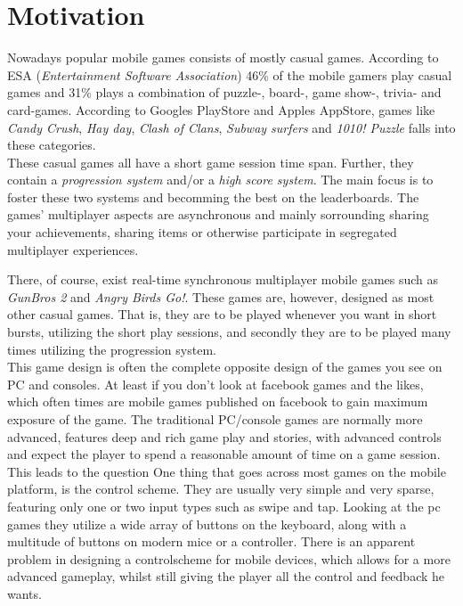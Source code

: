 \section{Motivation} \label{sec:motivation}
Nowadays popular mobile games consists of mostly casual games. According to ESA\cite{ESA}\cite{ESApdf} (\textit{Entertainment Software Association}) 46\% of the mobile gamers play casual games and 31\% plays a combination of puzzle-, board-, game show-, trivia- and card-games. According to Googles PlayStore\cite{googleplay} and Apples AppStore\cite{appstore}, games like \textit{Candy Crush}, \textit{Hay day}, \textit{Clash of Clans}, \textit{Subway surfers} and \textit{1010! Puzzle} falls into these categories.\\
These casual games all have a short game session time span. Further, they contain a \textit{progression system} and/or a \textit{high score system}. The main focus is to foster these two systems and becomming the best on the leaderboards. The games' multiplayer aspects are asynchronous and mainly sorrounding sharing your achievements, sharing items or otherwise participate in segregated multiplayer experiences.

There, of course, exist real-time synchronous multiplayer mobile games such as \textit{GunBros 2} and \textit{Angry Birds Go!}. These games are, however, designed as most other casual games. That is, they are to be played whenever you want in short bursts, utilizing the short play sessions, and secondly they are to be played many times utilizing the progression system.\\

This game design is often the complete opposite design of the games you see on PC and consoles. At least if you don't look at facebook games and the likes, which often times are mobile games published on facebook to gain maximum exposure of the game. The traditional PC/console games are normally more advanced, features deep and rich game play and stories, with advanced controls and expect the player to spend a reasonable amount of time on a game session. This leads to the question 
One thing that goes across most games on the mobile platform, is the control scheme. They are usually very simple and very sparse, featuring only one or two input types such as swipe and tap. Looking at the pc games they utilize a wide array of buttons on the keyboard, along with a multitude of buttons on modern mice or a controller. There is an apparent problem in designing a controlscheme for mobile devices, which allows for a more advanced gameplay, whilst still giving the player all the control and feedback he wants.

